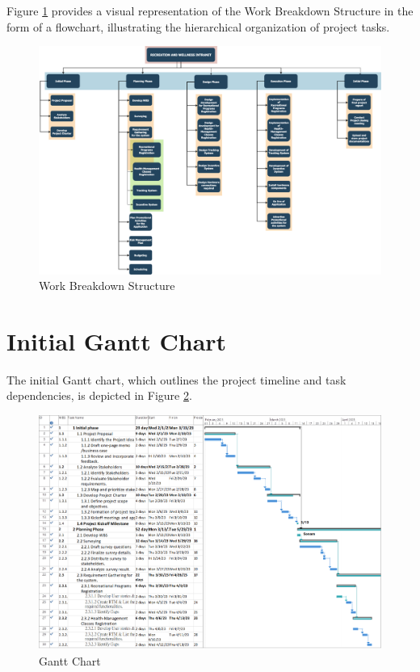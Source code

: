 Figure \ref{fig:wbs} provides a visual representation of the Work Breakdown Structure in the form of a flowchart, illustrating the hierarchical organization of project tasks.


\begin{figure}[ht]
    \includegraphics[width=\textwidth]{images/wbs.png}
    \caption{Work Breakdown Structure}
    \label{fig:wbs}
\end{figure}

\section{Initial Gantt Chart}

The initial Gantt chart, which outlines the project timeline and task dependencies, is depicted in Figure \ref{fig:gnt1}.

\begin{figure}[ht]
    \includegraphics[width=\textwidth]{images/gant.png}
    \caption{Gantt Chart}
    \label{fig:gnt1}
\end{figure}

\FloatBarrier
\newpage